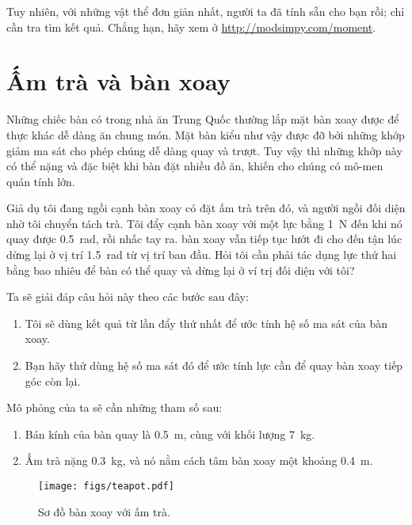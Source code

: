 \documentclass[12pt, openany]{book}
\theoremstyle{exercise}
\begin{document}
Tuy nhiên, với những vật thể đơn giản nhất, người ta đã tính sẵn cho bạn rồi; chỉ cần tra tìm kết quả. Chẳng hạn, hãy xem ở \url{http://modsimpy.com/moment}.


\section{Ấm trà và bàn xoay}

Những chiếc bàn có trong nhà ăn Trung Quốc thường lắp mặt bàn xoay được để thực khác dễ dàng ăn chung món. Mặt bàn kiểu như vậy được đỡ bởi những khớp giảm ma sát cho phép chúng dễ dàng quay và trượt. Tuy vậy thì những khớp này có thể nặng và đặc biệt khi bàn đặt nhiều đồ ăn, khiến cho chúng có mô-men quán tính lớn.


Giả dụ tôi đang ngồi cạnh bàn xoay có đặt ấm trà trên đó, và người ngồi đối diện nhờ tôi chuyển tách trà. Tôi đẩy cạnh bàn xoay với một lực bằng \SI{1}{\newton} đến khi nó quay được \SI{0.5}{\radian}, rồi nhấc tay ra. bàn xoay vẫn tiếp tục lướt đi cho đến tận lúc dừng lại ở vị trí \SI{1.5}{\radian} từ vị trí ban đầu. Hỏi tôi cần phải tác dụng lực thứ hai bằng bao nhiêu để bàn có thể quay và dừng lại ở ví trị đối diện với tôi?


Ta sẽ giải đáp câu hỏi này theo các bước sau đây:

\begin{enumerate}

\item
  Tôi sẽ dùng kết quả từ lần đẩy thứ nhất để ước tính hệ số ma sát 
  của bàn xoay.

\item
  Bạn hãy thử dùng hệ số ma sát đó để ước tính lực cần để quay bàn xoay tiếp góc còn lại.

\end{enumerate}

Mô phỏng của ta sẽ cần những tham số sau:

\begin{enumerate}
\item
  Bán kính của bàn quay là \SI{0.5}{\meter}, cùng với khối lượng \SI{7}{\kg}.
\item
  Ấm trà nặng \SI{0.3}{\kg}, và nó nằm cách tâm bàn xoay một khoảng \SI{0.4}{\meter}.
\end{enumerate}

\begin{figure}
\centerline{\texttt{[image: figs/teapot.pdf]}}
\caption{Sơ đồ bàn xoay với ấm trà.}
\label{teapot}
\end{figure}
\end{document}
